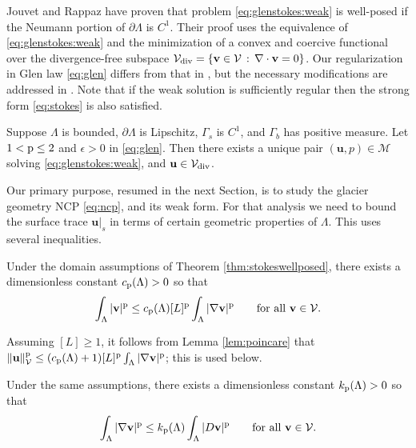 \documentclass[hidelinks,onefignum,onetabnum,final]{siamart220329}  %
\newcommand{\eps}{\epsilon}
\newcommand{\grad}{\nabla}
\newcommand{\Div}{\nabla\cdot}
\newcommand{\bu}{\mathbf{u}}
\newcommand{\bv}{\mathbf{v}}
\newcommand{\cV}{\mathcal{V}}
\newcommand{\pp}{{\text{\textnormal{p}}}}
\newcommand{\Vdiv}{\cV_{\text{\textnormal{div}}}}
\begin{document}
Jouvet and Rappaz \cite{JouvetRappaz2011} have proven that problem \eqref{eq:glenstokes:weak} is well-posed if the Neumann portion of $\partial\Lambda$ is $C^1$.  Their proof uses the equivalence of \eqref{eq:glenstokes:weak} and the minimization of a convex and coercive functional over the divergence-free subspace $\Vdiv = \{\bv\in\cV\,:\,\Div\bv=0\}$.  Our regularization in Glen law \eqref{eq:glen} differs from that in \cite{JouvetRappaz2011}, but the necessary modifications are addressed in \cite{IsaacStadlerGhattas2015}.  Note that if the weak solution is sufficiently regular then the strong form \eqref{eq:stokes} is also satisfied.

\begin{theorem} \label{thm:stokeswellposed}  Suppose $\Lambda$ is bounded, $\partial\Lambda$ is Lipschitz, $\Gamma_s$ is $C^1$, and $\Gamma_b$ has positive measure.  Let $1<\pp\le 2$ and $\eps>0$ in \eqref{eq:glen}.  Then there exists a unique pair $(\bu,p) \in \mathcal{M}$ solving \eqref{eq:glenstokes:weak}, and $\bu\in \Vdiv$.
\end{theorem}

Our primary purpose, resumed in the next Section, is to study the glacier geometry NCP \eqref{eq:ncp}, and its weak form.  For that analysis we need to bound the surface trace $\bu|_s$ in terms of certain geometric properties of $\Lambda$.  This uses several inequalities.

\begin{lemma} \label{lem:poincare}
Under the domain assumptions of Theorem \ref{thm:stokeswellposed}, there exists a dimensionless constant $c_{\pp}(\Lambda)>0$ so that
\begin{equation}
\int_\Lambda |\bv|^\pp \le c_{\pp}(\Lambda) [L]^\pp \int_\Lambda |\grad\bv|^\pp \qquad \text{for all } \bv \in \cV. \label{eq:poincare}
\end{equation}
\end{lemma}

Assuming $[L]\ge 1$, it  follows from Lemma \ref{lem:poincare} that $\|\bu\|_{\cV}^\pp \le (c_{\pp}(\Lambda) + 1) [L]^\pp \int_\Lambda |\grad\bv|^\pp$; this is used below.
 
\begin{lemma} \label{lem:korns}
Under the same assumptions, there exists a dimensionless constant $k_{\pp}(\Lambda)>0$ so that
\begin{equation}
\int_\Lambda |\grad\bv|^\pp \le k_{\pp}(\Lambda) \int_\Lambda |D\bv|^\pp \qquad \text{for all } \bv \in \cV. \label{eq:korns}
\end{equation}
\end{lemma}
\end{document}
